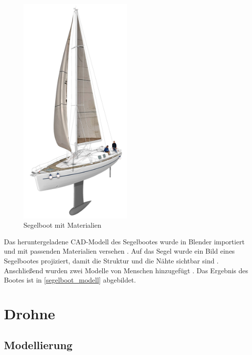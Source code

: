\begin{figure}[H]
\begin{center}
\includegraphics[width=0.5\textwidth]{gfx/prod/boat/boat.jpg}
\end{center}
\caption{Segelboot mit Materialien}
\label{segelboot_modell}
\end{figure}

Das heruntergeladene CAD-Modell des Segelbootes wurde in Blender importiert und mit passenden Materialien versehen . Auf das Segel wurde ein Bild eines Segelbootes projiziert, damit die Struktur und die Nähte sichtbar sind . Anschließend wurden zwei Modelle von Menschen hinzugefügt . Das Ergebnis des Bootes ist in \autoref{segelboot_modell} abgebildet.

\section{Drohne}

\subsection{Modellierung}

